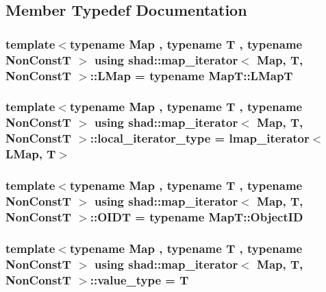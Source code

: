 \subsection{Member Typedef Documentation}
\hypertarget{classshad_1_1map__iterator_a157d8b69a2befd7e61c0df9eb52b2a71}{
\subsubsection[{L\-Map}]{\setlength{\rightskip}{0pt plus 5cm}template$<$typename Map , typename T , typename Non\-Const\-T $>$ using {\bf shad\-::map\-\_\-iterator}$<$ Map, T, Non\-Const\-T $>$\-::{\bf L\-Map} =  typename Map\-T\-::\-L\-Map\-T}}\label{classshad_1_1map__iterator_a157d8b69a2befd7e61c0df9eb52b2a71}
\hypertarget{classshad_1_1map__iterator_adceb72a3948aa860edd3a4c9ceca821d}{
\subsubsection[{local\-\_\-iterator\-\_\-type}]{\setlength{\rightskip}{0pt plus 5cm}template$<$typename Map , typename T , typename Non\-Const\-T $>$ using {\bf shad\-::map\-\_\-iterator}$<$ Map, T, Non\-Const\-T $>$\-::{\bf local\-\_\-iterator\-\_\-type} =  {\bf lmap\-\_\-iterator}$<${\bf L\-Map}, T$>$}}\label{classshad_1_1map__iterator_adceb72a3948aa860edd3a4c9ceca821d}
\hypertarget{classshad_1_1map__iterator_aecdaced930b9dcb48d5eff9ef992fbd5}{
\subsubsection[{O\-I\-D\-T}]{\setlength{\rightskip}{0pt plus 5cm}template$<$typename Map , typename T , typename Non\-Const\-T $>$ using {\bf shad\-::map\-\_\-iterator}$<$ Map, T, Non\-Const\-T $>$\-::{\bf O\-I\-D\-T} =  typename Map\-T\-::\-Object\-I\-D}}\label{classshad_1_1map__iterator_aecdaced930b9dcb48d5eff9ef992fbd5}
\hypertarget{classshad_1_1map__iterator_a52d94a1de8e6027b63d1a72daf0ff3d0}{
\subsubsection[{value\-\_\-type}]{\setlength{\rightskip}{0pt plus 5cm}template$<$typename Map , typename T , typename Non\-Const\-T $>$ using {\bf shad\-::map\-\_\-iterator}$<$ Map, T, Non\-Const\-T $>$\-::{\bf value\-\_\-type} =  T}}\label{classshad_1_1map__iterator_a52d94a1de8e6027b63d1a72daf0ff3d0}


